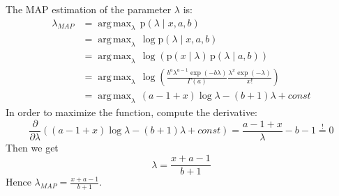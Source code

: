 \documentclass[12pt]{scrartcl}
\DeclareMathOperator*{\argmax}{arg\,max}
\newcommand{\p}[1][\mathrm{p}]{\mathrm{#1}}
\begin{document}
  The MAP estimation of the parameter $\lambda$ is:  
  \begin{equation*}
    \begin{split}
      \lambda_{MAP} &= \argmax_\lambda\,\p(\lambda\mid x, a, b) \\
                    &= \argmax_\lambda\,\log \p(\lambda\mid x, a, b) \\
                    &= \argmax_\lambda\,\log (\p(x\mid\lambda)\,\p(\lambda\mid a,b)) \\
                    &= \argmax_\lambda\,\log (\frac{b^a \lambda^{a-1} \exp(-b\lambda)}{\Gamma(a)} \frac{\lambda^x \exp(-\lambda)}{x!}) \\
                    &= \argmax_\lambda\,(a-1+x)\log \lambda -(b+1)\lambda + const 
    \end{split}
  \end{equation*}
  In order to maximize the function, compute the derivative:
  \begin{equation*}
    \frac{\partial}{\partial\lambda}((a-1+x)\log \lambda -(b+1)\lambda + const) = \frac{a-1+x}{\lambda}-b-1 \stackrel{!}{=} 0
  \end{equation*}
  Then we get
  \begin{equation*}
    \lambda = \frac{x+a-1}{b+1}
  \end{equation*}
  Hence $\lambda_{MAP}=\frac{x+a-1}{b+1}$.




 
\end{document}
